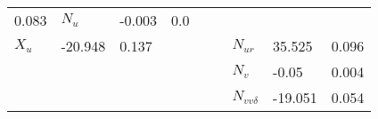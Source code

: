 \begin{table}[h!]
\begin{tabular}{l l l l l l l l l }
0.083
&

\( N_{u} \)
&

-0.003
&

0.0
\\


\( X_{u} \)
&

-20.948
&

0.137
&&&&

\( N_{ur} \)
&

35.525
&

0.096
\\
&&&&&&

\( N_{v} \)
&

-0.05
&

0.004
\\
&&&&&&

\( N_{vv\delta} \)
&

-19.051
&

0.054
\\
\bottomrule
\end{tabular}

\end{table}

